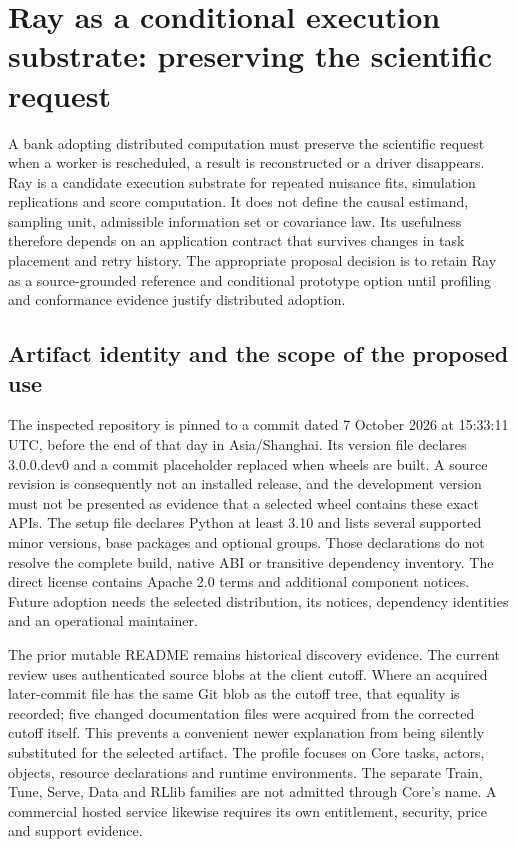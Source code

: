 \section{Ray as a conditional execution substrate: preserving the scientific request}
\label{sec:exec24-ray}
A bank adopting distributed computation must preserve the scientific request when a worker is rescheduled, a result is reconstructed or a driver disappears. Ray is a candidate execution substrate for repeated nuisance fits, simulation replications and score computation. It does not define the causal estimand, sampling unit, admissible information set or covariance law. Its usefulness therefore depends on an application contract that survives changes in task placement and retry history. The appropriate proposal decision is to retain Ray as a source-grounded reference and conditional prototype option until profiling and conformance evidence justify distributed adoption.\citep{exec24_ray_sources,exec24_ray_contract}

\subsection{Artifact identity and the scope of the proposed use}
The inspected repository is pinned to a commit dated 7 October 2026 at 15:33:11 UTC, before the end of that day in Asia/Shanghai. Its version file declares 3.0.0.dev0 and a commit placeholder replaced when wheels are built. A source revision is consequently not an installed release, and the development version must not be presented as evidence that a selected wheel contains these exact APIs. The setup file declares Python at least 3.10 and lists several supported minor versions, base packages and optional groups. Those declarations do not resolve the complete build, native ABI or transitive dependency inventory. The direct license contains Apache 2.0 terms and additional component notices. Future adoption needs the selected distribution, its notices, dependency identities and an operational maintainer.\citep{exec24_ray_sources}

The prior mutable README remains historical discovery evidence. The current review uses authenticated source blobs at the client cutoff. Where an acquired later-commit file has the same Git blob as the cutoff tree, that equality is recorded; five changed documentation files were acquired from the corrected cutoff itself. This prevents a convenient newer explanation from being silently substituted for the selected artifact. The profile focuses on Core tasks, actors, objects, resource declarations and runtime environments. The separate Train, Tune, Serve, Data and RLlib families are not admitted through Core's name. A commercial hosted service likewise requires its own entitlement, security, price and support evidence.\citep{exec24_ray_sources,exec24_ray_contract}

